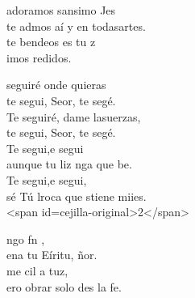 \documentclass[12pt]{article}
\begin{document}
\begin{multicols*}{2}
\begin{cancion}[Te adoramos][]%
	adoramos sansimo Jes\\
	te admos aí y en todasartes.\\
	te bendeos es  tu z\\
	imos redidos.\\
\end{cancion}%

\begin{cancion}[Te seguiré][Ixcís]%
	seguiré onde quieras\\
	te segui, Seor, te segé. \\
	Te seguiré, dame lasuerzas,\\
	te segui, Seor, te segé. \\
\jump
	Te segui,e segui \\
	aunque tu liz nga que be. \\
	Te segui,e segui, \\
	sé Tú lroca que stiene miies.\\
<span id=cejilla-original>2</span>\\
\end{cancion}%

\begin{cancion}%
	ngo fn ,\\
	ena tu Eíritu, ñor.\\
	me cil a tuz,\\
	ero obrar  solo des la fe.\\
\end{cancion}%


\end{multicols*}
\end{document}
